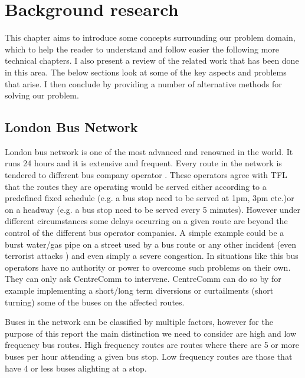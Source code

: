 \chapter{Background research}
This chapter aims to introduce some concepts surrounding our problem domain, which to help the reader to understand and follow easier the following more technical chapters. I also present a review of the related work that has been done in this area. The below sections look at some of the key aspects and problems that arise. I then conclude by providing a number of alternative methods for solving our problem.

\section{London Bus Network}
London bus network is one of the most advanced and renowned in the world. It runs 24 hours and it is extensive and frequent. Every route in the network is tendered to different bus company operator \cite{busTendering}. These operators agree with TFL that the routes they are operating would be served either according to a predefined fixed schedule (e.g. a bus stop need to be served at 1pm, 3pm etc.)or on a headway (e.g. a bus stop need to be served every 5 minutes). However under different circumstances some delays occurring on a given route are beyond the control of the different bus operator companies. A simple example could be a burst water/gas pipe on a street used by a bus route or any other incident (even terrorist attacks \cite{centreComm}) and even simply a severe congestion. In situations like this bus operators have no authority or power to overcome such problems on their own. They can only ask CentreComm to intervene. CentreComm can do so by for example implementing a short/long term diversions or curtailments (short turning) some of the buses on the affected routes.

Buses in the network can be classified by multiple factors, however for the purpose of this report the main distinction we need to consider are high and low frequency bus routes. High frequency routes are routes where there are 5 or more buses per hour attending a given bus stop. Low frequency routes are those that have 4 or less buses alighting at a stop.
